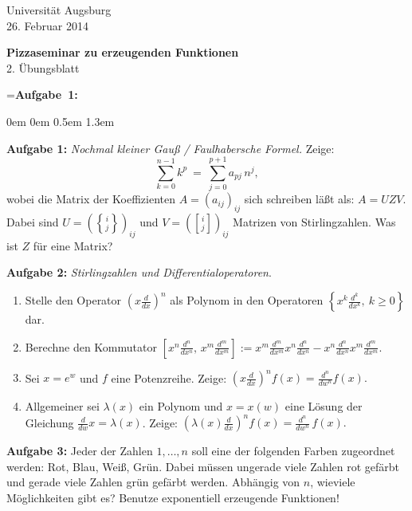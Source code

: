 \documentclass[a4paper,ngerman]{scrartcl}
\theoremstyle{definition}
\theoremstyle{plain}
\theoremstyle{remark}
\newcommand{\diff}[2]{\frac{d#2 }{d #1 #2 }}
\begin{document}
\vspace*{-4em}
\begin{flushright}Universität Augsburg \\ 26. Februar 2014\end{flushright}

\begin{center}\Large \textbf{Pizzaseminar zu erzeugenden Funktionen} \\
2. Übungsblatt
\end{center}
\vspace{1.5em}

\newbox{\mybox}
\setbox\mybox=\hbox{\textbf{Aufgabe 1:}}

\begin{list}{}{0em \leftmargin0em \itemindent0.5em \itemsep 1.3em}
\item[\textbf{Aufgabe 1:}]
\emph{Nochmal kleiner Gauß / Faulhabersche Formel. } Zeige:
$$\sum_{k=0}^{n-1} k^p\ =\ \sum_{j=0}^{p+1} a_{pj}\, n^j,$$
wobei die Matrix der Koeffizienten $A = (a_{ij})_{ij}$ sich schreiben läßt als: $A = UZV$. Dabei sind $ U=\left(\genfrac\{\}{0pt}{}{i}{j}\right)_{ij} $ und $V=\left(\genfrac[]{0pt}{}{i}{j}\right)_{ij} $ Matrizen von Stirlingzahlen. Was ist $Z$ für eine Matrix?

\item[\textbf{Aufgabe 2:}] \emph{Stirlingzahlen und Differentialoperatoren}.
\begin{enumerate}
\item Stelle den Operator $\left(x\diff{x}{}\right)^n$ als Polynom in den Operatoren $\left\{x^k\diff{x}{^k},\ k\geq0\right\}$ dar.
\item Berechne den Kommutator $\left[x^n\diff{x}{^n},\,x^m\diff{x}{^m}\right] :=x^m\diff{x}{^m} x^n\diff{x}{^n} - x^n \diff{x}{^n}x^m\diff{x}{^m} $.
\item Sei $x=e^w$ und $f$ eine Potenzreihe. Zeige: $ \left(x\diff{x}{}\right)^n f(x)=
\diff{w}{^n}f(x).
$
\item Allgemeiner sei $\lambda(x)$ ein Polynom und $x = x(w)$ eine Lösung der Gleichung $\diff{w}{}x = \lambda(x)$.  Zeige:
$\left(\lambda(x)\diff{x}{}\right)^n f(x)= \diff{w}{^n}\,f(x). $
\end{enumerate} 

\item[\textbf{Aufgabe 3: }] Jeder der Zahlen $1,\ldots,n$ soll eine der folgenden Farben zugeordnet werden: Rot, Blau, Weiß, Grün. Dabei müssen ungerade viele Zahlen rot gefärbt und gerade viele Zahlen grün gefärbt werden. Abhängig von $n$, wieviele Möglichkeiten gibt es? Benutze exponentiell erzeugende Funktionen!


\end{list}
\end{document}
